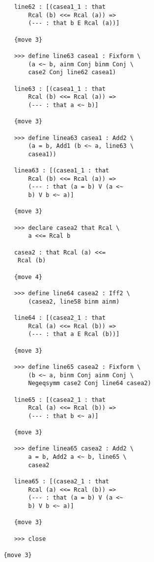 \documentclass[12pt]{article}
\begin{document}
\begin{verbatim}
            line62 : [(casea1_1 : that 
                Rcal (b) <<= Rcal (a)) => 
                (--- : that b E Rcal (a))]

            {move 3}

            >>> define line63 casea1 : Fixform \
                (a <~ b, ainm Conj binm Conj \
                case2 Conj line62 casea1)

            line63 : [(casea1_1 : that 
                Rcal (b) <<= Rcal (a)) => 
                (--- : that a <~ b)]

            {move 3}

            >>> define linea63 casea1 : Add2 \
                (a = b, Add1 (b <~ a, line63 \
                casea1))

            linea63 : [(casea1_1 : that 
                Rcal (b) <<= Rcal (a)) => 
                (--- : that (a = b) V (a <~ 
                b) V b <~ a)]

            {move 3}

            >>> declare casea2 that Rcal \
                a <<= Rcal b

            casea2 : that Rcal (a) <<= 
             Rcal (b)

            {move 4}

            >>> define line64 casea2 : Iff2 \
                (casea2, line58 binm ainm)

            line64 : [(casea2_1 : that 
                Rcal (a) <<= Rcal (b)) => 
                (--- : that a E Rcal (b))]

            {move 3}

            >>> define line65 casea2 : Fixform \
                (b <~ a, binm Conj ainm Conj \
                Negeqsymm case2 Conj line64 casea2)

            line65 : [(casea2_1 : that 
                Rcal (a) <<= Rcal (b)) => 
                (--- : that b <~ a)]

            {move 3}

            >>> define linea65 casea2 : Add2 \
                a = b, Add2 a <~ b, line65 \
                casea2

            linea65 : [(casea2_1 : that 
                Rcal (a) <<= Rcal (b)) => 
                (--- : that (a = b) V (a <~ 
                b) V b <~ a)]

            {move 3}

            >>> close

         {move 3}


\end{verbatim}
\end{document}
